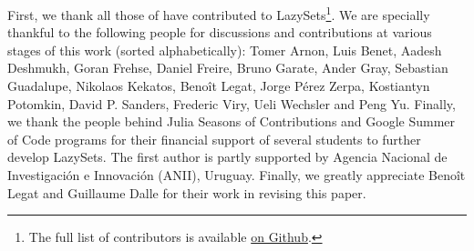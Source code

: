 First, we thank all those of have contributed to LazySets\footnote{The full list of contributors is available \href{https://github.com/JuliaReach/LazySets.jl/graphs/contributors}{on Github}.}.
%
We are specially thankful to the following people for discussions and contributions at various stages of this work (sorted alphabetically): Tomer Arnon, Luis Benet, Aadesh Deshmukh, Goran Frehse, Daniel Freire, Bruno Garate, Ander Gray, Sebastian Guadalupe, Nikolaos Kekatos, Beno\^it Legat, Jorge P\'{e}rez Zerpa, Kostiantyn Potomkin, David P. Sanders, Frederic Viry, Ueli Wechsler and Peng Yu.
%
Finally, we thank the people behind Julia Seasons of Contributions and Google Summer of Code programs for their financial support of several students to further develop LazySets.
%
The first author is partly supported by Agencia Nacional de Investigaci\'{o}n e Innovaci\'{o}n (ANII), Uruguay.
%
Finally, we greatly appreciate Beno\^it Legat and Guillaume Dalle for their work in revising this paper.
